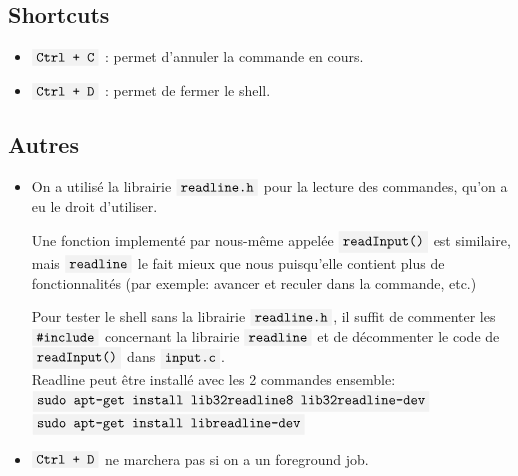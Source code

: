 \documentclass[french]{article}
\newcommand{\code}[1]{$\mbox{\colorbox{light-gray}{\texttt{#1}}}$}
\begin{document}
\subsection*{Shortcuts}
\begin{itemize}
    \item \code{Ctrl + C} : permet d'annuler la commande en cours.
    \item \code{Ctrl + D} : permet de fermer le shell.
\end{itemize}

\subsection*{Autres}
\begin{itemize}
    \item On a utilisé la librairie \code{readline.h} pour la lecture des commandes, qu'on a eu le droit d'utiliser.
    
    Une fonction implementé par nous-même appelée \code{readInput()} est similaire, mais \code{readline} le fait mieux que nous puisqu'elle contient plus de fonctionnalités (par exemple: avancer et reculer dans la commande, etc.)

    Pour tester le shell sans la librairie \code{readline.h}, il suffit de commenter les \code{\#include} concernant la librairie \code{readline} et de décommenter le code de \code{readInput()} dans \code{input.c}.\\

    Readline peut être installé avec les 2 commandes ensemble:\\
    \code{sudo apt-get install lib32readline8 lib32readline-dev}\\
    \code{sudo apt-get install libreadline-dev}
    \\
    \item \code{Ctrl + D} ne marchera pas si on a un foreground job.

\end{itemize}
\end{document}
